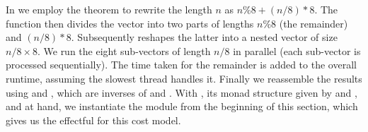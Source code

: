In  we employ the theorem  to rewrite the length
$n$ as $n \% 8 + (n / 8) * 8$.  The function  then divides the
vector into two parts of lengths $n \% 8$ (the remainder) and $(n / 8) * 8$.
Subsequently  reshapes the latter into a nested vector of size $n/8
\times 8$.  We run the eight sub-vectors of length $n/8$ in parallel (each
sub-vector is processed sequentially).  The time taken for the remainder is
added to the overall runtime, assuming the slowest thread handles it.  Finally
we reassemble the results using  and , which are inverses
of  and .  With , its monad structure given by
 and \AF{\_>>=\_}, and  at hand, we instantiate the module
 from the beginning of this section, which gives us the effectful
 for this cost model.

